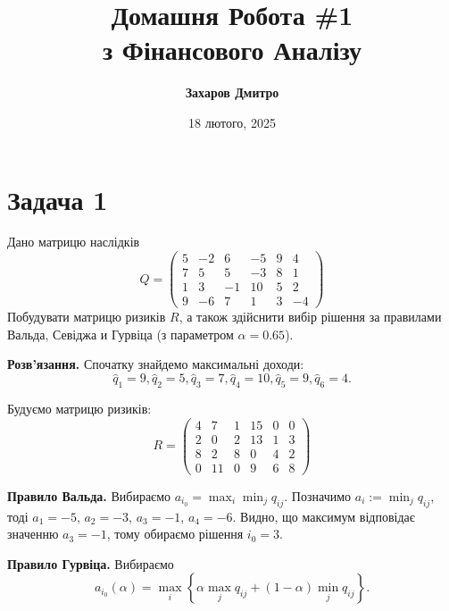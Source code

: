 \documentclass{hw_template}
\title{\bfseries Домашня Робота \#1 \\з Фінансового Аналізу}
\author{\bfseries Захаров Дмитро}
\date{18 лютого, 2025}
\begin{document}
\pagestyle{fancy}

\maketitle

\section{Задача 1}

\begin{problem}
    Дано матрицю наслідків 
    \begin{equation*}
        Q = \begin{pmatrix}
            5 & -2 & 6 & -5 & 9 & 4 \\
            7 & 5 & 5 & -3 & 8 & 1 \\
            1 & 3 & -1 & 10 & 5 & 2 \\
            9 & -6 & 7 & 1 & 3 & -4 
        \end{pmatrix}
    \end{equation*}     
    Побудувати матрицю ризиків $R$, а також здійснити вибір рішення за
    правилами Вальда, Севіджа и Гурвіца (з параметром $\alpha=0.65$).
\end{problem}

\textbf{Розв'язання.} Спочатку знайдемо максимальні доходи:
\begin{equation*}
    \hat{q}_1 = 9, \hat{q}_2 = 5, \hat{q}_3 = 7, \hat{q}_4 = 10, \hat{q}_5 = 9, \hat{q}_6 = 4.
\end{equation*}

Будуємо матрицю ризиків:
\begin{equation*}
    R = \begin{pmatrix}
        4 & 7 & 1 & 15 & 0 & 0\\
        2 & 0 & 2 & 13 & 1 & 3\\
        8 & 2 & 8 & 0 & 4 & 2\\
        0 & 11 & 0 & 9 & 6 & 8
    \end{pmatrix}
\end{equation*}

\textbf{Правило Вальда.} Вибираємо $a_{i_0} = \max_i\min_j q_{ij}$. Позначимо 
$a_i := \min_j q_{ij}$, тоді $a_1=-5$, $a_2=-3$, $a_3=-1$, $a_4=-6$. Видно, 
що максимум відповідає значенню $a_3=-1$, тому обираємо рішення $i_0=3$.

\textbf{Правило Гурвіца.} Вибираємо
\begin{equation*}
    a_{i_0}(\alpha) = \max_i \left\{ \alpha \max_j q_{ij} + (1-\alpha)\min_j q_{ij} \right\}.
\end{equation*}
\end{document}
